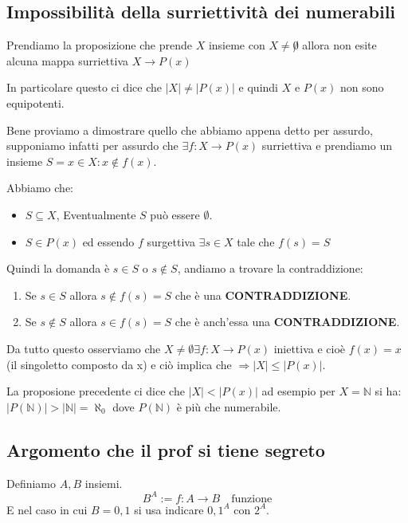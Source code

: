 \documentclass{article}
\begin{document}
\subsection{Impossibilità della surriettività dei numerabili}
Prendiamo la proposizione che prende $X$ insieme con $X \not =  \not 0$ allora non esite alcuna mappa surriettiva $X \to P(x)$ \par
In particolare questo ci dice che $|X| \not = |P(x)|$ e quindi $X$ e $P(x)$ non sono equipotenti.

Bene proviamo a dimostrare quello che abbiamo appena detto per assurdo, supponiamo infatti per assurdo che $\exists f : X \to P(x)$ surriettiva e prendiamo un insieme $S = {x \in X : x \not \in f(x)}$. \par 
Abbiamo che:
\begin{itemize}
        \item $S \subseteq X$, Eventualmente $S$ può essere $\emptyset$.
        \item $S \in P(x)$ ed essendo $f$ surgettiva $\exists s \in X$ tale che $f(s) = S$ 
\end{itemize}
Quindi la domanda è $s \in S$ o $s \not \in S$, andiamo a trovare la contraddizione:
\begin{enumerate}
        \item Se $s \in S$ allora $s \not \in f(s) = S$ che è una \textbf{CONTRADDIZIONE}.
        \item Se $s \not \in S$ allora $s \in f(s) = S$ che è anch'essa una \textbf{CONTRADDIZIONE}.
\end{enumerate}

Da tutto questo osserviamo che $X \not = \emptyset \exists f : X \to P(x)$ iniettiva e cioè $f(x) = {x}$ (il singoletto composto da x) e ciò implica che $\Rightarrow |X| \le |P(x)|$. 

La proposione precedente ci dice che $|X| < |P(x)|$ ad esempio per $X = \mathbb{N}$ si ha: \newline
$|P(\mathbb{N})| > |\mathbb{N}| = \aleph_0 $ dove $P(\mathbb{N})$ è più che numerabile.


\subsection{Argomento che il prof si tiene segreto}
Definiamo $A,B$ insiemi.
\begin{equation}
        B^A := {f:A \to B \quad \mbox{funzione}}
\end{equation}
E nel caso in cui $B = {0,1}$ si usa indicare ${0,1}^A$ con $2^A$.
\end{document}
